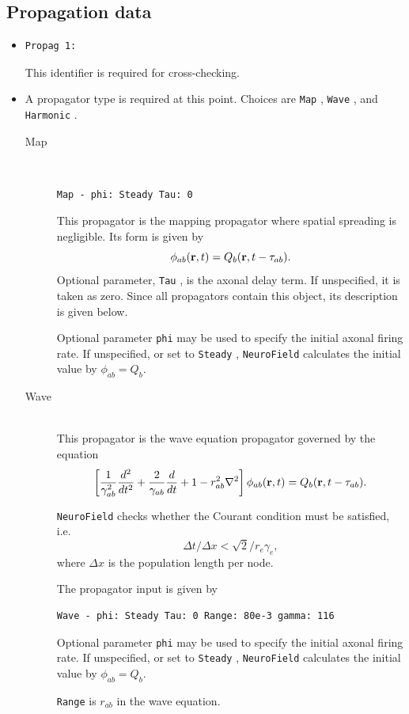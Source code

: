 \documentclass[12pt,a4paper]{article}
\newcommand{\type}[1]{ {\small\small\tt #1} }
\newcommand{\NF}[0]{ \type{NeuroField}}
\begin{document}
\subsection{Propagation data}
\label{sec:prop}
\begin{itemize}
\item
	\begin{lstlisting}
Propag 1:
	\end{lstlisting}
	This identifier is required for cross-checking.
\item A propagator type is required at this point. Choices are \type{Map}, \type{Wave}, and \type{Harmonic}.
\begin{description}
	\item[Map]\ \\
	\begin{lstlisting}
Map - phi: Steady Tau: 0
	\end{lstlisting}
	This propagator is the mapping propagator where spatial spreading is negligible. Its form is given by
	\[\phi_{ab}({\bf r}, t) = Q_b ({\bf r}, t - \tau_{ab}).\]
	Optional parameter, \type{Tau}, is the axonal delay term. If unspecified, it is taken as zero. Since all propagators contain this object, its description is given below.

	Optional parameter \type{phi} may be used to specify the initial axonal firing rate. If unspecified, or set to \type{Steady}, \NF calculates the initial value by \(\phi_{ab}=Q_{b}\).

	\item[Wave]\ \\
	This propagator is the wave equation propagator governed by the equation
	\[\left[\frac{1}{\gamma_{ab}^2}\frac{d^2}{d t^2}+\frac{2}{\gamma_{ab}}\frac{d} {d t}+1 -r^2_{ab}\nabla^2 \right] \phi_{ab}({\bf r},t) =Q_b({\bf r},t-\tau_{ab}).\]

	\NF checks whether the Courant condition must be satisfied, i.e. \[\Delta t/\Delta x<\sqrt{2}/r_e\gamma_e,\] where $\Delta x$ is the population length per node.

	The propagator input is given by
	\begin{lstlisting}
Wave - phi: Steady Tau: 0 Range: 80e-3 gamma: 116
	\end{lstlisting}

	Optional parameter \type{phi} may be used to specify the initial axonal firing rate. If unspecified, or set to \type{Steady}, \NF calculates the initial value by \(\phi_{ab}=Q_{b}\).

	\type{Range} is $r_{ab}$ in the wave equation.
	

\end{description}
\end{itemize}
\end{document}
